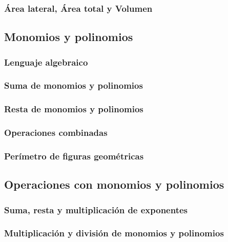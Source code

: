 \documentclass[12pt,repaso,answers]{RDS_unit}
\begin{document}
\begin{questions}
	\subsubsection{Área lateral, Área total y Volumen}
	\question[1]{}
	\subsection   {Monomios y polinomios}
	\subsubsection{Lenguaje algebraico}
	\question[1]{}
	\subsubsection{Suma de monomios y polinomios}
	\question[1]{}
	\subsubsection{Resta de monomios y polinomios}
	\question[1]{}
	\subsubsection{Operaciones combinadas}
	\question[1]{}
	\subsubsection{Perímetro de figuras geométricas}
	\question[1]{}
	\subsection   {Operaciones con monomios y polinomios}
	\subsubsection{Suma, resta y multiplicación de exponentes}
	\question[1]{}
	\subsubsection{Multiplicación y división de monomios y polinomios}
	\question[1]{}

\end{questions}
\end{document}
